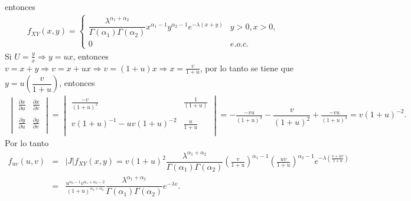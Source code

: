 \begin{Ejem}
entonces
\begin{eqnarray*}
f_{XY} \left(x,y \right)=
\begin{cases}
\dfrac{\lambda^{\alpha_{1}+\alpha_{2} } }{\Gamma \left(\alpha_{1}\right)\Gamma \left(\alpha_{2}\right)} x^{\alpha_{1}-1} y^{\alpha_{2}-1}e^{-\lambda \left( x+y \right) } & y>0, x>0, \\ 
0 & e.o.c.
\end{cases}
\end{eqnarray*}
Si $U=\frac{y}{x} \Rightarrow y=ux$, entonces $v=x+y \Rightarrow v= x+ux \Rightarrow v= \left( 1+u \right)x \Rightarrow x= \frac{v}{1+u}$, por lo tanto se tiene que $y= u \left( \dfrac{v}{1+u}\right)$, entonces
\begin{eqnarray*}
\begin{vmatrix}
\frac{\partial x}{\partial u} & \frac{\partial x}{\partial v} \\\\
\frac{\partial y}{\partial u} & \frac{\partial y}{\partial v}\\
\end{vmatrix} = \begin{vmatrix}
\frac{-v}{\left(1+u \right)^{2} } & \frac{1}{\left(1+u \right)} \\\\
v\left(1+u \right)^{-1}-uv \left(1+u \right)^{-2} & \frac{u}{1+u}\\
\end{vmatrix}=-\frac{-vu}{\left( 1+u \right)^{3}}-\dfrac{v}{\left(1+u \right)^{2}}+ \frac{-vu}{\left(1+u \right)^{3}}= v \left(1+u \right)^{-2}.
\end{eqnarray*}
Por lo tanto 
\begin{eqnarray*}
f_{uv} \left(u,v \right)&=&|J| f_{XY}\left(x,y \right)=v \left(1+u \right)^{2} \dfrac{\lambda^{\alpha_{1}+\alpha_{2} } }{\Gamma \left(\alpha_{1}\right)\Gamma \left(\alpha_{2}\right)} \left( \frac{v}{1+u}\right)^{ \alpha_{1}-1} \left( \frac{uv}{1+u} \right)^{\alpha_{2}-1}e^{-\lambda \left(\frac{v+uv}{1+u} \right)}\\
&=&\frac{u^{\alpha_{2}-1}v^{\alpha_{1}+\alpha_{2}-2}}{\left(1+u \right)^{ \alpha_{2}+ \alpha_{2}}} \dfrac{\lambda^{\alpha_{1}+\alpha_{2} } }{\Gamma\left(\alpha_{1}\right)\Gamma\left(\alpha_{2}\right)} e^{-\lambda v }.
\end{eqnarray*}
\end{Ejem}


